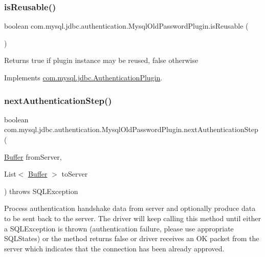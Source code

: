 \subsubsection{\texorpdfstring{is\+Reusable()}{isReusable()}}
{\footnotesize\ttfamily boolean com.\+mysql.\+jdbc.\+authentication.\+Mysql\+Old\+Password\+Plugin.\+is\+Reusable (\begin{DoxyParamCaption}{ }\end{DoxyParamCaption})}

\begin{DoxyReturn}{Returns}
true if plugin instance may be reused, false otherwise 
\end{DoxyReturn}


Implements \mbox{\hyperlink{interfacecom_1_1mysql_1_1jdbc_1_1_authentication_plugin_abf6de7affb05904b1dba5517a17421d1}{com.\+mysql.\+jdbc.\+Authentication\+Plugin}}.

\mbox{\label{classcom_1_1mysql_1_1jdbc_1_1authentication_1_1_mysql_old_password_plugin_a0a1725f9a449c72b77a493bce2d57bdd}} 
\subsubsection{\texorpdfstring{next\+Authentication\+Step()}{nextAuthenticationStep()}}
{\footnotesize\ttfamily boolean com.\+mysql.\+jdbc.\+authentication.\+Mysql\+Old\+Password\+Plugin.\+next\+Authentication\+Step (\begin{DoxyParamCaption}\item[{\mbox{\hyperlink{classcom_1_1mysql_1_1jdbc_1_1_buffer}{Buffer}}}]{from\+Server,  }\item[{List$<$ \mbox{\hyperlink{classcom_1_1mysql_1_1jdbc_1_1_buffer}{Buffer}} $>$}]{to\+Server }\end{DoxyParamCaption}) throws S\+Q\+L\+Exception}

Process authentication handshake data from server and optionally produce data to be sent back to the server. The driver will keep calling this method until either a S\+Q\+L\+Exception is thrown (authentication failure, please use appropriate S\+Q\+L\+States) or the method returns false or driver receives an OK packet from the server which indicates that the connection has been already approved.


